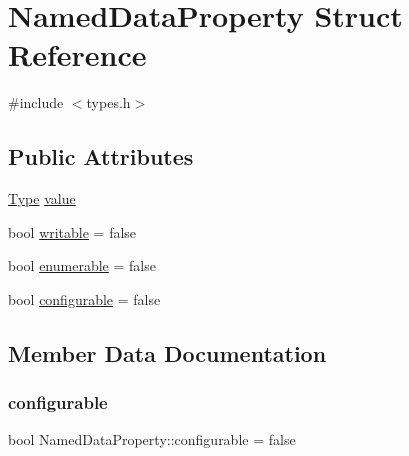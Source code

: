 \hypertarget{struct_named_data_property}{}\section{Named\+Data\+Property Struct Reference}
\label{struct_named_data_property}


{\ttfamily \#include $<$types.\+h$>$}

\subsection*{Public Attributes}
\begin{DoxyCompactItemize}
\item 
\hyperlink{types_8h_a742f51ca48e5d91bd1430409106f245d}{Type} \hyperlink{struct_named_data_property_a24c2a352d9e584c219ee0f9f6aaeb34e}{value}
\item 
bool \hyperlink{struct_named_data_property_a83f0bc6d87115a6c14f4644eac90c3e7}{writable} = false
\item 
bool \hyperlink{struct_named_data_property_adc471862166c903c652bd46b439f094e}{enumerable} = false
\item 
bool \hyperlink{struct_named_data_property_aeb6547dc7d587a6c93d3c65baf3c6307}{configurable} = false
\end{DoxyCompactItemize}


\subsection{Member Data Documentation}
\mbox{\label{struct_named_data_property_aeb6547dc7d587a6c93d3c65baf3c6307}} 
\subsubsection{\texorpdfstring{configurable}{configurable}}
{\footnotesize\ttfamily bool Named\+Data\+Property\+::configurable = false}

\mbox{\label{struct_named_data_property_adc471862166c903c652bd46b439f094e}} 
